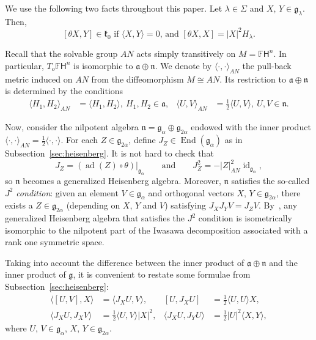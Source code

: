 \documentclass[12pt, a4paper]{amsart}
\newcommand{\g}{\mathfrak}
\newcommand{\s}{\mathsf}
\newcommand{\ad}{\operatorname{ad}}
\newcommand{\End}{\operatorname{End}}
\newcommand{\id}{\operatorname{id}}
\theoremstyle{definition}
\begin{document}
We use the following two facts throughout this paper.
Let $\lambda\in\Sigma$ and $X,\,Y\in\g{g}_\lambda$.
Then, 
\[
[\theta X,Y]\in\g{k}_0
\text{ if $\langle X,Y\rangle=0$, and }
[\theta X,X]=\lvert X\rvert^2 H_\lambda.
\]

Recall that the solvable group $AN$ acts simply transitively on $M=\mathbb{F}\s{H}^n$.
In particular, $T_o\mathbb{F}\s{H}^n$ is isomorphic to $\g{a}\oplus\g{n}$.
We denote by $\langle \cdot , \cdot \rangle_{AN}$ the pull-back metric induced on $AN$
from the diffeomorphism $M\cong AN$.
Its restriction to $\g{a}\oplus \g{n}$ is determined by the conditions
\[
\begin{aligned}
\langle H_1,H_2\rangle_{AN}
&{}=\langle H_1,H_2\rangle,\
H_1, H_2\in\g{a},
&\langle U,V\rangle_{AN}
&{}=\frac{1}{2}\langle U,V\rangle,\
U, V\in\g{n}.
\end{aligned}
\]

Now, consider the nilpotent algebra $\g{n}=\g{g}_\alpha\oplus \g{g}_{2\alpha}$ endowed with the inner product 
$\langle \cdot,\cdot \rangle_{AN} = \tfrac{1}{2}\langle \cdot,\cdot \rangle$.
For each $Z\in\g{g}_{2\alpha}$, define $J_Z\in \End(\g{g}_\alpha)$ as in Subsection~\ref{sec:heisenberg}.
It is not hard to check that
\begin{equation*}
    J_Z=(\ad(Z)\circ\theta)\vert_{\g{g}_\alpha}
    \qquad
    \text{and}
    \qquad
    J_Z ^2 = - \lvert Z \rvert_{{AN}}^2\id_{\g{g}_\alpha},
\end{equation*}
so $\g{n}$ becomes a generalized Heisenberg algebra.
Moreover, $\g{n}$ satisfies the so-called $J^2$ \textit{condition}:
given an element $V\in \g{g}_\alpha$ and orthogonal vectors $X$, $Y\in \g{g}_{2\alpha}$, there exists a $Z\in \g{g}_{2\alpha}$ (depending on $X$, $Y$ and $V$) satisfying $J_X J_Y V = J_Z V$.
By~\cite[Theorem~1.1]{cowling-h-type}, any generalized Heisenberg algebra that satisfies the $J^2$ condition is isometrically isomorphic to the nilpotent part of the Iwasawa decomposition associated with a rank one symmetric space.

Taking into account the difference between the inner product of $\g{a}\oplus\g{n}$ 
and the inner product of $\g{g}$, 
it is convenient to restate some formulae from Subsection~\ref{sec:heisenberg}:
\begin{align*}
	\langle[U,V],X\rangle
	&{}=\langle J_X U,V\rangle,
	&[U,J_X U]
	&{}=\frac{1}{2}\langle U,U\rangle X,\\
	\langle J_X U,J_X V\rangle
	&{}=\frac{1}{2}\langle U,V\rangle\lvert X\rvert^2,
	&\langle J_X U,J_Y U\rangle
	&{}=\frac{1}{2}\lvert U\rvert^2\langle X,Y\rangle,
\end{align*}
where $U,\,V\in\g{g}_\alpha$, $X,\,Y\in\g{g}_{2\alpha}$.
\end{document}
